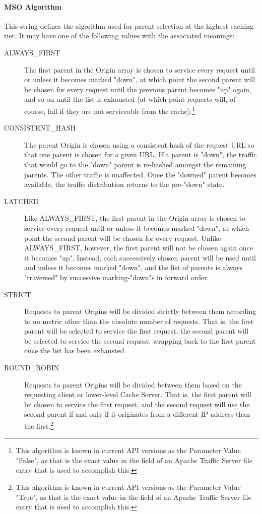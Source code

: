 \paragraph{MSO Algorithm}
This string defines the algorithm used for parent selection at the highest
caching tier. It may have one of the following values with the associated
meanings:

\begin{description}
	\item[ALWAYS\_FIRST] The first parent in the Origin array is chosen to
	service every request until or unless it becomes marked "down", at which
	point the second parent will be chosen for every request until the previous
	parent becomes "up" again, and so on until the list is exhausted (at which
	point requests will, of course, fail if they are not serviceable from the
	cache).\footnote{This algorithm is known in current API versions as the
	 Parameter Value "False", as that is the exact value in
	the  field of an Apache Traffic Server
	 file entry that is used to accomplish this.}
	\item[CONSISTENT\_HASH] The parent Origin is chosen using a consistent hash
	of the request URL so that one parent is chosen for a given URL. If a parent
	is "down", the traffic that would go to the "down" parent is re-hashed
	amongst the remaining parents. The other traffic is unaffected. Once the
	"downed" parent becomes available, the traffic distribution returns to the
	pre-"down" state.
	\item[LATCHED] Like ALWAYS\_FIRST, the first parent in the Origin array is
	chosen to service every request until or unless it becomes marked "down", at
	which point the second parent will be chosen for every request. Unlike
	ALWAYS\_FIRST, however, the first parent will not be chosen again once it
	becomes "up". Instead, each successively chosen parent will be used until
	and unless it becomes marked "down", and the list of parents is always
	"traversed" by successive marking-"down"s in forward order.
	\item[STRICT] Requests to parent Origins will be divided strictly between
	them according to no metric other than the absolute number of requests. That
	is, the first parent will be selected to service the first request, the
	second parent will be selected to service the second request, wrapping back
	to the first parent once the list has been exhausted.
	\item[ROUND\_ROBIN] Requests to parent Origins will be divided between them
	based on the requesting client or lower-level Cache Server. That is, the
	first parent will be chosen to service the first request, and the second
	request will use the second parent if and only if it originates from a
	different IP address than the first.\footnote{This algorithm is known in
	current API versions as the  Parameter Value "True", as
	that is the exact value in the  field of an Apache
	Traffic Server  file entry that is used to accomplish
	this.}
\end{description}

